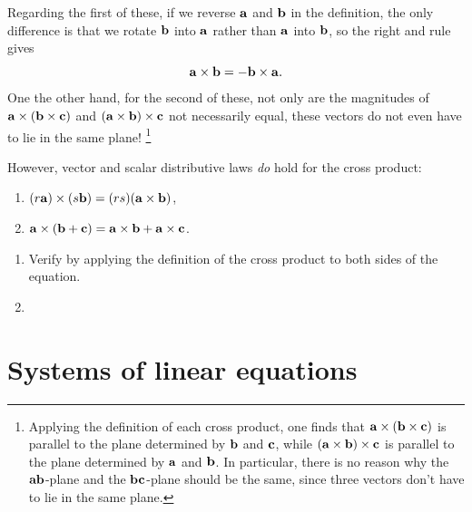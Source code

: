 \documentclass[12pt,letterpaper,reqno]{article}
\numberwithin{equation}{section}
\newcommand{\ti}[1]{\textit{#1}}
\newcommand{\fixme}[1]{{\color{orange}{[#1]}}}
\begin{document}
Regarding the first of these, if we reverse ${\bf a}$ and ${\bf b}$ in the definition, the only difference is that we rotate ${\bf b}$ into ${\bf a}$ rather than ${\bf a}$ into ${\bf b}$, so the right and rule gives
\begin{equation}
	{\bf a} \times {\bf b}=-{\bf b} \times {\bf a}.
\end{equation}
One the other hand, for the second of these, not only are the magnitudes of ${\bf a} \times ({\bf b} \times {\bf c})$ and $({\bf a} \times {\bf b}) \times {\bf c}$ not necessarily equal, these vectors do not even have to lie in the same plane! \footnote{Applying the definition of each cross product, one finds that ${\bf a} \times ({\bf b} \times {\bf c})$ is parallel to the plane determined by ${\bf b}$ and ${\bf c}$, while $({\bf a} \times {\bf b}) \times {\bf c}$ is parallel to the plane determined by ${\bf a}$ and ${\bf b}$. In particular, there is no reason why the ${\bf a}{\bf b}$-plane and the ${\bf b}{\bf c}$-plane should be the same, since three vectors don't have to lie in the same plane.}

However, vector and scalar distributive laws \ti{do} hold for the cross product:
\begin{prop}
	\begin{enumerate}[(1)]\hspace{10cm}
	\item $(r{\bf a}) \times (s{\bf b})=(rs)({\bf a} \times {\bf b})$,
	\item ${\bf a} \times ({\bf b} + {\bf c})={\bf a} \times {\bf b}+{\bf a} \times {\bf c}$.
\end{enumerate}
\end{prop}

\begin{pf}
\begin{enumerate}[(1)]\hspace{10cm}
	\item Verify by applying the definition of the cross product to both sides of the equation.
	\item \fixme{Add proof.}
\end{enumerate}	
\end{pf}







\section{Systems of linear equations}
\end{document}
